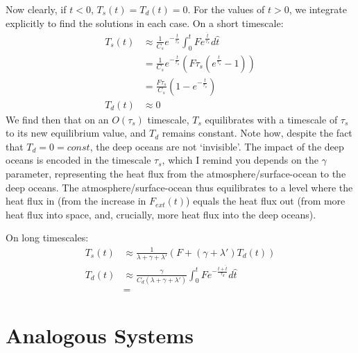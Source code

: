 Now clearly, if $t<0$, $T_s(t)=T_d(t)=0$. For the values of $t>0$, we integrate explicitly to find the solutions in each case. On a short timescale:
\begin{align*}
    T_s(t) & \approx \frac{1}{C_s}e^{-\frac{t}{\tau_s}}\int_0^t F e^{\frac{\hat{t}}{\tau_s}}d\hat{t}\\
    &=\frac{1}{C_s}e^{-\frac{t}{\tau_s}} \left( F\tau_s
    \left( e^{\frac{t}{\tau_s}} - 1 \right) \right)\\
    &=\frac{F\tau_s}{C_s}\left( 1-e^{-\frac{t}{\tau_s}} \right)
    \\ 
    T_d(t)& \approx 0 
\end{align*}
We find then that on an $O(\tau_s)$ timescale, $T_s$ equilibrates with a timescale of $\tau_s$ to its new equilibrium value, and $T_d$ remains constant. Note how, despite the fact that $T_d=0=const$, the deep oceans are not `invisible'. The impact of the deep oceans is encoded in the timescale $\tau_s$, which I remind you depends on the $\gamma$ parameter, representing the heat flux from the atmosphere/surface-ocean to the deep oceans. The atmosphere/surface-ocean thus equilibrates to a level where the heat flux in (from the increase in $F_{ext}(t)$) equals the heat flux out (from more heat flux into space, and, crucially, more heat flux into the deep oceans).

On long timescales:
\begin{align}
    T_s(t) & \approx \frac{1}{\lambda+\gamma+\lambda'}\left(F+(\gamma+\lambda ')T_d(t)\right) \\ 
    T_d(t) & \approx \frac{\gamma}{C_d(\lambda+\gamma+\lambda')}\int_0^t F e^{-\frac{t+\hat{t}}{\tau_d}}d\hat{t}\\
    &=
\end{align}

\section{Analogous Systems}


